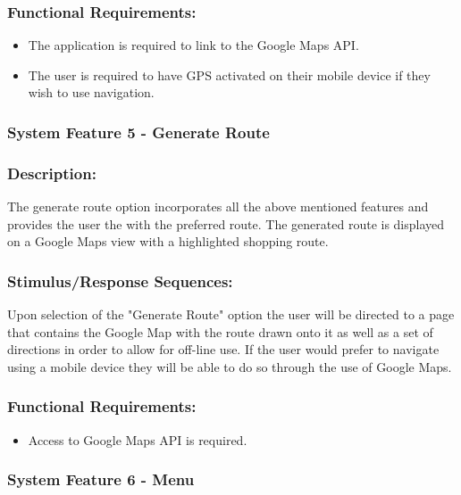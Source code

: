 \documentclass[10pt,twocolumn]{witseiepaper}
\begin{document}
		\subsubsection*{Functional Requirements:}
		
		\begin{itemize}
			\item The application is required to link to the Google Maps API. 
			\item The user is required to have GPS activated on their mobile device if they wish to use navigation.
		\end{itemize}
		
		\subsubsection{System Feature 5 - Generate Route}
		
		\subsubsection*{Description:}
		
		The generate route option incorporates all the above mentioned features and provides the user the with the preferred route. The generated route is displayed on a Google Maps view with a highlighted shopping route. 
		
		\subsubsection*{Stimulus/Response Sequences:}
		
		Upon selection of the "Generate Route" option the user will be directed to a page that contains the Google Map with the route drawn onto it as well as a set of directions in order to allow for off-line use. If the user would prefer to navigate using a mobile device they will be able to do so through the use of Google Maps.
		
		\subsubsection*{Functional Requirements:}
		
		\begin{itemize}
			\item Access to Google Maps API is required.
		\end{itemize}
		
		\subsubsection{System Feature 6 - Menu}
		
\end{document}
